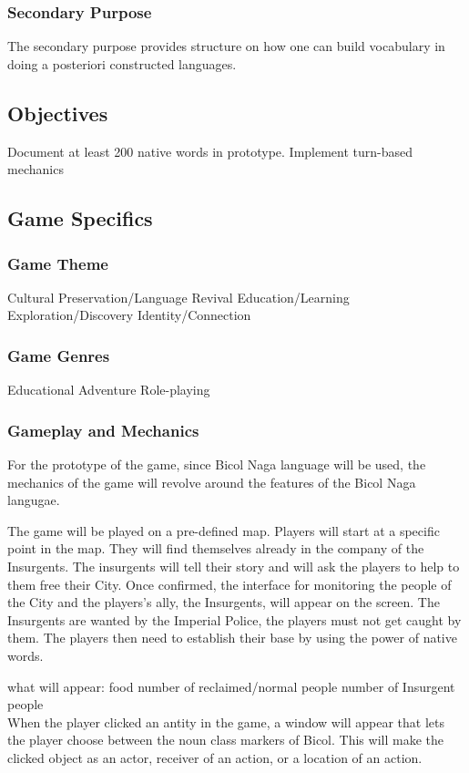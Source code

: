 \documentclass[11pt]{article}
\begin{document}
\subsubsection{Secondary Purpose}
The secondary purpose provides structure on how one can build vocabulary in doing a posteriori constructed languages.


\subsection{Objectives}
Document at least 200 native words in prototype.
Implement turn-based mechanics

\subsection{Game Specifics}
\subsubsection{Game Theme}
Cultural Preservation/Language Revival
Education/Learning
Exploration/Discovery
Identity/Connection
\subsubsection{Game Genres}
Educational
Adventure
Role-playing
\subsubsection{Gameplay and Mechanics}
For the prototype of the game, since Bicol Naga language will be used, the mechanics of the game will revolve around the features of the Bicol Naga langugae. 

The game will be played on a pre-defined map. Players will start at a specific point in the map. They will find themselves already in the company of the Insurgents. The insurgents will tell their story and will ask the players to help to them free their City. Once confirmed, the interface for monitoring the people of the City and the players's ally, the Insurgents, will appear on the screen. The Insurgents are wanted by the Imperial Police, the players must not get caught by them. The players then need to establish their base by using the power of  native words.  

what will appear:
food
number of reclaimed/normal people
number of Insurgent people \\
When the player clicked an antity in the game, a window will appear that lets the player choose between the noun class markers of Bicol. This will make the clicked object as an actor, receiver of an action, or a location of an action.\\
\end{document}
